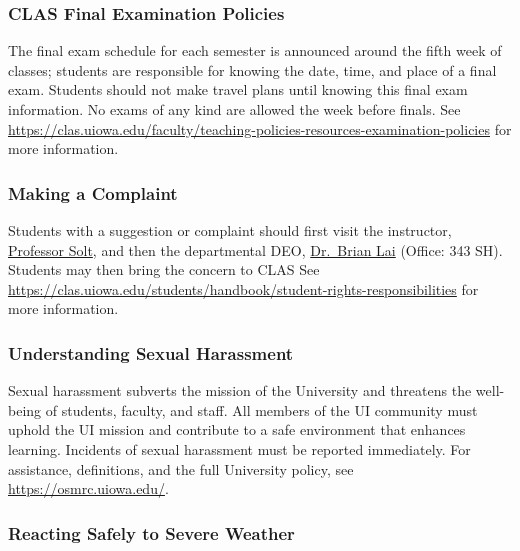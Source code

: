 \documentclass[]{article}
\begin{document}
\hypertarget{clas-final-examination-policies}{%
\subsubsection{CLAS Final Examination
Policies}\label{clas-final-examination-policies}}

The final exam schedule for each semester is announced around the fifth
week of classes; students are responsible for knowing the date, time,
and place of a final exam. Students should not make travel plans until
knowing this final exam information. No exams of any kind are allowed
the week before finals. See
\url{https://clas.uiowa.edu/faculty/teaching-policies-resources-examination-policies}
for more information.

\hypertarget{making-a-complaint}{%
\subsubsection{Making a Complaint}\label{making-a-complaint}}

Students with a suggestion or complaint should first visit the
instructor, \href{mailto:frederick-solt@uiowa.edu}{Professor Solt}, and
then the departmental DEO, \href{mailto:brian-lai@uiowa.edu}{Dr.~Brian
Lai} (Office: 343 SH). Students may then bring the concern to CLAS See
\url{https://clas.uiowa.edu/students/handbook/student-rights-responsibilities}
for more information.

\hypertarget{understanding-sexual-harassment}{%
\subsubsection{Understanding Sexual
Harassment}\label{understanding-sexual-harassment}}

Sexual harassment subverts the mission of the University and threatens
the well-being of students, faculty, and staff. All members of the UI
community must uphold the UI mission and contribute to a safe
environment that enhances learning. Incidents of sexual harassment must
be reported immediately. For assistance, definitions, and the full
University policy, see \url{https://osmrc.uiowa.edu/}.

\hypertarget{reacting-safely-to-severe-weather}{%
\subsubsection{Reacting Safely to Severe
Weather}\label{reacting-safely-to-severe-weather}}
\end{document}
